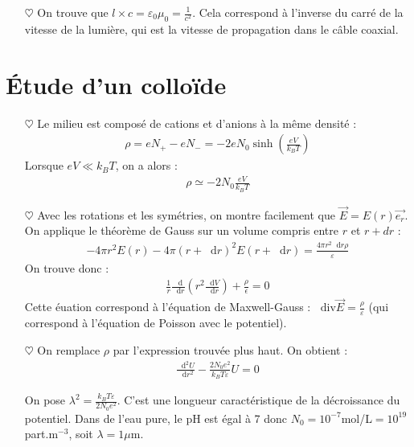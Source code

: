 \documentclass{report}
\newcommand*\dif{\mathop{}\!\mathrm{d}}
\newcommand*\diver{\mathop{}\!\mathrm{div}}
\begin{document}
\begin{itemize}
	\item[$\heartsuit$] On trouve que $l\times c=\varepsilon_0\mu_0=\frac{1}{c^2}$. Cela correspond à l'inverse du carré de la vitesse de la lumière, qui est la vitesse de propagation dans le câble coaxial.
	
\end{itemize}

\section*{Étude d'un colloïde}

\begin{itemize}

	\item[$\heartsuit$] Le milieu est composé de cations et d'anions à la même densité :
	\begin{align*}
		\rho=eN_+-eN_-=-2eN_0\sinh\left( \frac{eV}{k_BT}\right) 
	\end{align*}
Lorsque $eV\ll k_BT$, on a alors : 
\begin{align*}
	\rho\simeq -2N_0\frac{eV}{k_BT}
\end{align*}

	\item[$\heartsuit$] Avec les rotations et les symétries, on montre facilement que $\vec{E}=E(r)\vec{e_r}$. On applique le théorème de Gauss sur un volume compris entre $r$ et $r+dr$ :
	\begin{align*}
		-4\pi r^2E(r)-4\pi(r+\dif r)^2E(r+\dif r)=\frac{4\pi r^2\dif r\rho}{\varepsilon}
	\end{align*}
	On trouve donc :
	\begin{align*}
		\frac{1}{r}\frac{\dif}{\dif r}\left( r^2\frac{\dif V}{\dif r}\right) +\frac{\rho}{\epsilon}=0
	\end{align*}
	Cette éuation correspond à l'équation de Maxwell-Gauss : $\diver\vec{E}=\frac{\rho}{\varepsilon}$ (qui correspond à l'équation de Poisson avec le potentiel).

	\item[$\heartsuit$] On remplace $\rho$ par l'expression trouvée plus haut. On obtient : 
	\begin{align*}
		\frac{\dif^2U}{\dif r^2}-\frac{2N_0e^2}{k_BT\varepsilon}U=0
	\end{align*}
	
	On pose $\lambda^2 = \frac{k_BT\varepsilon}{2N_0e^2}$. C'est une longueur caractéristique de la décroissance du potentiel. Dans de l'eau pure, le pH est égal à 7 donc $N_0=10^{-7}$mol/L$=10^{19}$part.m$^{-3}$, soit $\lambda=1\mu$m.
	

\end{itemize}
\end{document}
